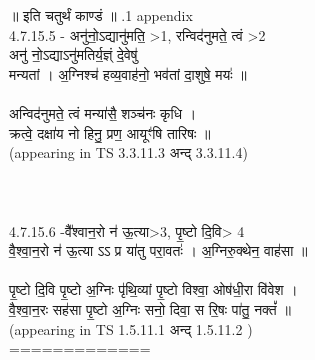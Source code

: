 \documentclass[17pt]{extarticle}
\begin{document}
॥ इति चतुर्थं काण्डं ॥ \newline
{}.1   appendix\\4.7.15.5 - अनु॑नो॒ऽद्यानु॑मति॒ >1, रन्विद॑नुमते॒ त्वं >2\\अनु॑ नो॒ऽद्याऽनु॑मतिर्य॒ज्ञ्ं दे॒वेषु॑ \\मन्यतां । अ॒ग्निश्च॑ हव्य॒वाह॑नो॒ भव॑तां दा॒शुषे॒ मयः॑ ॥\\\\अन्विद॑नुमते॒ त्वं मन्या॑सै॒ शञ्च॑नः कृधि । \\क्रत्वे॒ दक्षा॑य नो हिनु॒ प्रण॒ आयूꣳ॑षि तारिषः ॥\\(appearing in TS 3.3.11.3 अन्द् 3.3.11.4)\\\\\\\\4.7.15.6 -वै᳚श्वान॒रो न॑ ऊ॒त्या>3, पृ॒ष्टो दि॒वि> 4\\वै॒श्वा॒न॒रो न॑ ऊ॒त्या ऽऽ प्र या॑तु परा॒वतः॑ । अ॒ग्निरु॒क्थेन॒ वाह॑सा ॥\\\\पृ॒ष्टो दि॒वि पृ॒ष्टो अ॒ग्निः पृ॑थि॒व्यां पृ॒ष्टो विश्वा॒ ओष॑धी॒रा वि॑वेश । \\वै॒श्वा॒न॒रः सह॑सा पृ॒ष्टो अ॒ग्निः सनो॒ दिवा॒ स रि॒षः पा॑तु॒ नक्तं᳚ ॥ \\(appearing in TS 1.5.11.1 अन्द् 1.5.11.2 )\\=============\\\\
\pagebreak
        
\end{document}

